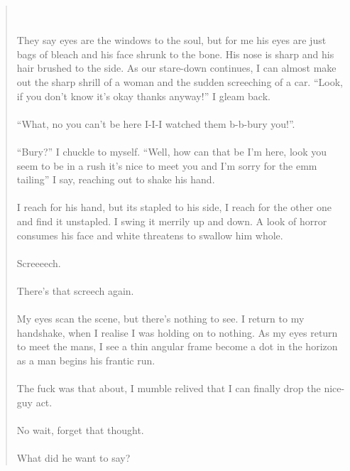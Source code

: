 \documentclass{book}
\begin{document}
\begin{quote}
{{\\\\They say eyes are the windows to the soul, but for me his eyes are just bags of bleach and his face shrunk to the bone. His nose is sharp and his hair brushed to the side. As our stare-down continues, I can almost make out the sharp shrill of a woman and the sudden screeching of a car.
``Look, if you don't know it's okay thanks anyway!'' I gleam back.
\\\\``What, no you can't be here I-I-I watched them b-b-bury you!''.
\\\\``Bury?'' I chuckle to myself. ``Well, how can that be I'm here, look you seem to be in a rush it's nice to meet you and I'm sorry for the emm tailing'' I say, reaching out to shake his hand.
\\\\I reach for his hand, but its stapled to his side, I reach for the other one and find it unstapled. I swing it merrily up and down. A look of horror consumes his face and white threatens to swallow him whole.
\\\\Screeeech.
\\\\There's that screech again.
\\\\My eyes scan the scene, but there's nothing to see. I return to my handshake, when I realise I was holding on to nothing. As my eyes return to meet the mans, I see a thin angular frame become a dot in the horizon as a man begins his frantic run.
\\\\The fuck was that about, I mumble relived that I can finally drop the nice-guy act.
\\\\No wait, forget that thought.
\\\\What did he want to say?
}}
\end{quote}
\end{document}
